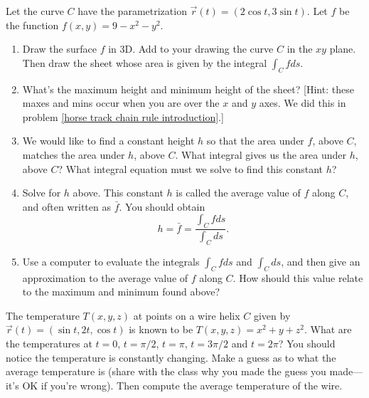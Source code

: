 \begin{problem}\label{Average Value intro}%
%
 Let the curve $C$ have the parametrization $\vec r(t) = (2\cos t, 3\sin t)$.  Let $f$ be the function $f(x,y)=9-x^2-y^2$.    \begin{enumerate}
  \item Draw the surface $f$ in 3D.  Add to your drawing the curve $C$ in the $xy$ plane. Then draw the sheet whose area is given by the integral $\int_C f ds$. 
  \item What's the maximum height and minimum height of the sheet? [Hint: these maxes and mins occur when you are over the $x$ and $y$ axes. We did this in problem \ref{horse track chain rule introduction}.]
  \item We would like to find a constant height $h$ so that the area under $f$, above $C$, matches the area under $h$, above $C$. What integral gives us the area under $h$, above $C$?  What integral equation must we solve to find this constant $h$?
  \item {}%
Solve for $h$ above. This constant $h$ is called the average value of $f$ along $C$, and often written as $\bar f$. You should obtain 
$$h=\bar f = \frac{\int_C f ds}{\int_C ds}.$$

  \item Use a computer to evaluate the integrals $\int_C f ds$ and $\int_C ds$, and then give an approximation to the average value of $f$ along $C$. How should this value relate to the maximum and minimum found above?
 \end{enumerate}
\end{problem}

\begin{problem}%
 The temperature $T(x,y,z)$ at points on a wire helix $C$ given by $\vec r(t) = (\sin t, 2t, \cos t)$ is known to be $T(x,y,z)=x^2+y+z^2$. What are the temperatures at $t=0$, $t=\pi/2$, $t=\pi$, $t=3\pi/2$ and $t=2\pi$?  You should notice the temperature is constantly changing.  Make a guess as to what the average temperature is (share with the class why you made the guess you made---it's OK if you're wrong). Then compute the average temperature of the wire.
\end{problem}
